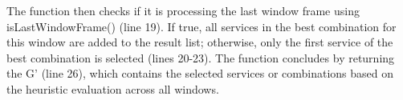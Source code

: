   The function then checks if it is processing the last window frame using isLastWindowFrame() (line 19). If true, all services in the best combination for this window are added to the result list; otherwise, only the first service of the best combination is selected (lines 20-23). The function concludes by returning the  $\text{G'}$ (line 26), which contains the selected services or combinations based on the heuristic evaluation across all windows.
